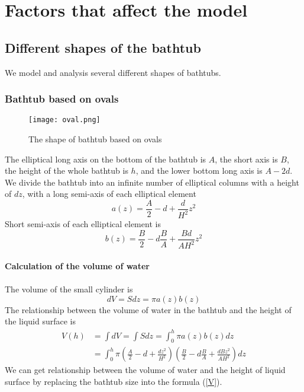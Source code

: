 \documentclass{mcmthesis}
\begin{document}
\section{Factors that affect the model}
\subsection{Different shapes of the bathtub}
We model and analysis several different shapes of bathtubs.
\subsubsection{Bathtub based on ovals}
\begin{figure}[H]
\centerline{\texttt{[image: oval.png]}}
\caption{The shape of bathtub based on ovals}
\label{oval}	
\end{figure}
The elliptical long axis on the bottom of the bathtub is $A$, the short axis is $B$, the height of the whole bathtub is $h$, and the lower bottom long axis is $A-2d$.\\
\indent We divide the bathtub into an infinite number of elliptical columns with a height of $dz$, with a long semi-axis of each elliptical element\\
\begin{equation}
a(z)=\frac{A}{2}-d+\frac{d}{{H}^{2}}{z}^{2}
\end{equation}
\indent Short semi-axis of each elliptical element is
\begin{equation}
b(z)=\frac{B}{2}-d\frac{B}{A}+\frac{Bd}{A{H}^{2}}{z}^{2}
\end{equation}\\
\textbf{Calculation of the volume of water} \\\\
\indent The volume of the small cylinder is
\begin{equation}
dV=Sdz=\pi a(z)b(z)
\end{equation}
\indent The relationship between the volume of water in the bathtub and the height of the liquid surface is
\begin{equation}
\begin{split}
V(h)&=\int dV=\int Sdz=\int_{0}^{h}\pi a(z)b(z)dz \\
&=\int_{0}^{h}\pi(\frac{A}{2}-d+\frac{d{z}^{2}}{{H}^{2}})(\frac{B}{2}-d\frac{B}{A}+\frac{dB{z}^{2}}{A{H}^{2}})dz
\label{V}
\end{split}
\end{equation}
\indent We can get relationship between the volume of water and the height of liquid surface by replacing the bathtub size into the formula (\ref{V}).\\\\
\end{document}
